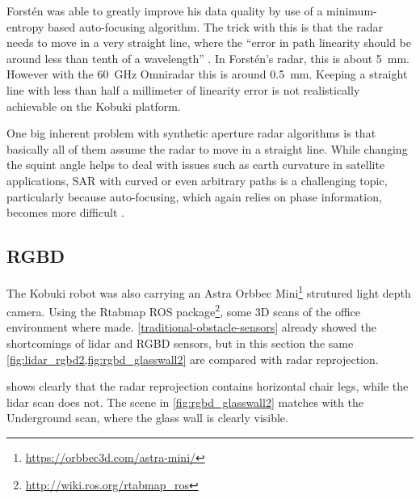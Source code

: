 Forstén was able to greatly improve his data quality by use of a minimum-entropy based auto-focusing algorithm. The trick with this is that the radar needs to move in a very straight line, where the ``error in path linearity should be around less than tenth of a wavelength'' \cite{Forsten2015}. In Forstén's radar, this is about \SI{5}{mm}. However with the \SI{60}{GHz} Omniradar this is around \SI{0.5}{mm}. Keeping a straight line with less than half a millimeter of linearity error is not realistically achievable on the Kobuki platform.

One big inherent problem with synthetic aperture radar algorithms is
that basically all of them assume the radar to move in a straight line.
While changing the squint angle helps to deal with issues such as earth
curvature in satellite applications, SAR with curved or even arbitrary
paths is a challenging topic, particularly because auto-focusing, which
again relies on phase information, becomes more difficult
\cite{Axelsson2002}.

\subsection{RGBD}\label{rgbd-1}
The Kobuki robot was also carrying an Astra Orbbec Mini\footnote{\url{https://orbbec3d.com/astra-mini/}} strutured light depth camera. Using the Rtabmap \cite{Labbe2014} ROS package\footnote{\url{http://wiki.ros.org/rtabmap_ros}}, some 3D scans of the office environment where made. \cref{traditional-obstacle-sensors} already showed the shortcomings of lidar and RGBD sensors, but in this section the same \cref{fig:lidar_rgbd2,fig:rgbd_glasswall2} are compared with radar reprojection.

 shows clearly that the radar reprojection contains horizontal chair legs, while the lidar scan does not. The scene in \cref{fig:rgbd_glasswall2} matches with the Underground scan, where the glass wall is clearly visible.

